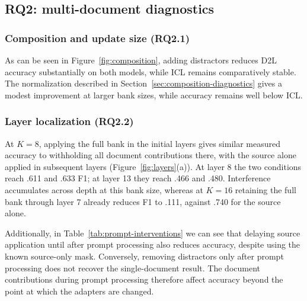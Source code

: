 \subsection{RQ2: multi-document diagnostics}
\label{sec:res-composition}
\label{sec:res-gap}
\subsubsection{Composition and update size (RQ2.1)}
As can be seen in Figure~\ref{fig:composition}, adding distractors reduces
D2L accuracy substantially on both models, while ICL remains comparatively
stable. The normalization described in Section~\ref{sec:composition-diagnostics}
gives a modest improvement at larger bank sizes, while accuracy remains well
below ICL.

\subsubsection{Layer localization (RQ2.2)}
\label{sec:res-layers}
At $K=8$, applying the full bank in the initial layers gives similar measured
accuracy to withholding all document contributions there, with the source
alone applied in subsequent layers (Figure~\ref{fig:layers}(a)).
At layer 8 the two conditions reach .611 and .633 F1; at layer 13 they reach
.466 and .480. Interference accumulates across depth at this bank size,
whereas at $K=16$ retaining the full bank through layer 7 already reduces
F1 to .111, against .740 for the source alone.

Additionally, in Table~\ref{tab:prompt-interventions} we can see that delaying source application
until after prompt processing also reduces accuracy, despite using the known
source-only mask. Conversely, removing distractors only after prompt processing
does not recover the single-document result. The document contributions during
prompt processing therefore affect accuracy beyond the point at which the
adapters are changed.

